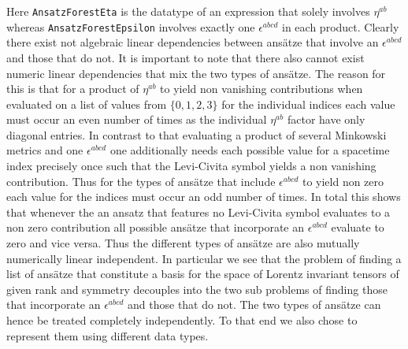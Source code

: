 \documentclass[a4paper,12pt, DIV=14, BCOR=5mm, twoside, headsepline]{scrbook}
\begin{document}
Here \texttt{AnsatzForestEta} is the datatype of an expression that solely involves $\eta^{ab}$ whereas \texttt{AnsatzForestEpsilon} involves exactly one $\epsilon^{abcd}$ in each product.
Clearly there exist not algebraic linear dependencies between ansätze that involve an $\epsilon^{abcd}$ and those that do not. 
It is important to note that there also cannot exist numeric linear dependencies that mix the two types of ansätze. The reason for this is that for a product of $\eta^{ab}$ to yield non vanishing contributions when evaluated on a list of values from $\{0,1,2,3 \}$ for the individual indices each value must occur an even number of times as the individual $\eta^{ab}$ factor have only diagonal entries. In contrast to that evaluating a product of several Minkowski metrics and one $\epsilon^{abcd}$ one additionally needs each possible value for a spacetime index precisely once such that the Levi-Civita symbol yields a non vanishing contribution. Thus for the types of ansätze that include $\epsilon^{abcd}$ to yield non zero each value for the indices must occur an odd number of times. In total this shows that whenever the an ansatz that features no Levi-Civita symbol evaluates to a non zero contribution all possible ansätze that incorporate an $\epsilon^{abcd}$ evaluate to zero and vice versa. Thus the different types of ansätze are also mutually numerically linear independent. In particular we see that the problem of finding a list of ansätze that constitute a basis for the space of Lorentz invariant tensors of given rank and symmetry decouples into the two sub problems of finding those that incorporate an $\epsilon^{abcd}$ and those that do not. The two types of ansätze can hence be treated completely independently. To that end we also chose to represent them using different data types.
\end{document}
